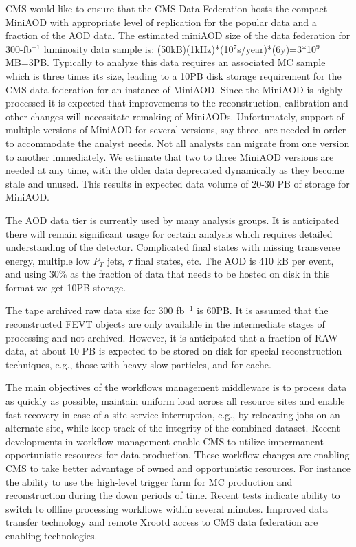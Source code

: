\documentclass[11pt,a4paper]{article}
\begin{document}
CMS would like to ensure that the CMS Data Federation hosts the
compact MiniAOD with appropriate level of replication for the popular
data and a fraction of the AOD data.  The estimated miniAOD size of
the data federation for 300-fb$^{-1}$ luminosity data sample is:
(50kB)(1kHz)*(10$^7$s/year)*(6y)=3*10$^9$MB=3PB.  Typically to analyze
this data requires an associated MC sample which is three times its
size, leading to a 10PB disk storage requirement for the CMS data
federation for an instance of MiniAOD. Since the MiniAOD is highly
processed it is expected that improvements to the reconstruction,
calibration and other changes will necessitate remaking of MiniAODs.
Unfortunately, support of multiple versions of MiniAOD for several
versions, say three, are needed in order to accommodate the analyst
needs.  Not all analysts can migrate from one version to another
immediately.  We estimate that two to three MiniAOD versions are
needed at any time, with the older data deprecated dynamically as they
become stale and unused.  This results in expected data volume of
20-30 PB of storage for MiniAOD.

The AOD data tier is currently used by many analysis groups.  It is
anticipated there will remain significant usage for certain analysis
which requires detailed understanding of the detector.  Complicated
final states with missing transverse energy, multiple low $P_T$ jets,
$\tau$ final states, etc.  The AOD is 410 kB per event, and using 30\%
as the fraction of data that needs to be hosted on disk in this format
we get 10PB storage.

The tape archived raw data size for 300 fb$^{-1}$ is 60PB.  It is
assumed that the reconstructed FEVT objects are only available in the
intermediate stages of processing and not archived.  However, it is
anticipated that a fraction of RAW data, at about 10 PB is expected to
be stored on disk for special reconstruction techniques, e.g., those
with heavy slow particles, and for cache.


The main objectives of the workflows management middleware is to
process data as quickly as possible, maintain uniform load across all
resource sites and enable fast recovery in case of a site service
interruption, e.g., by relocating jobs on an alternate site, while
keep track of the integrity of the combined dataset.  Recent
developments in workflow management enable CMS to utilize impermanent
opportunistic resources for data production. These workflow changes
are enabling CMS to take better advantage of owned and opportunistic
resources.  For instance the ability to use the high-level trigger
farm for MC production and reconstruction during the down periods of
time. Recent tests indicate ability to switch to offline processing
workflows within several minutes. Improved data transfer technology
and remote Xrootd access to CMS data federation are enabling
technologies.
\end{document}
